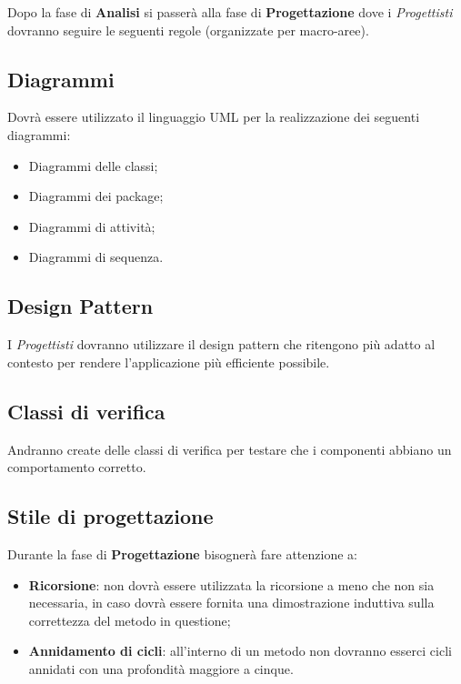 Dopo la fase di \textbf{Analisi} si passerà alla fase di \textbf{Progettazione} dove i \textit{Progettisti} dovranno seguire le seguenti regole (organizzate per macro-aree).\\

\subsection{Diagrammi}

Dovrà essere utilizzato il linguaggio UML per la realizzazione dei seguenti diagrammi:

\begin{itemize}
	\item Diagrammi delle classi;
	\item Diagrammi dei package;
	\item Diagrammi di attività;
	\item Diagrammi di sequenza.
\end{itemize}

\subsection{Design Pattern}

I \textit{Progettisti} dovranno utilizzare il design pattern che ritengono più adatto al contesto per rendere l'applicazione più efficiente possibile.

\subsection{Classi di verifica}

Andranno create delle classi di verifica per testare che i componenti abbiano un comportamento corretto.

\subsection{Stile di progettazione}

Durante la fase di \textbf{Progettazione} bisognerà fare attenzione a:

\begin{itemize}
\item \textbf{Ricorsione}: non dovrà essere utilizzata la ricorsione a meno che non sia necessaria, in caso dovrà essere fornita una dimostrazione induttiva sulla correttezza del metodo in questione;
\item \textbf{Annidamento di cicli}: all'interno di un metodo non dovranno esserci cicli annidati con una profondità maggiore a cinque.
\end{itemize}